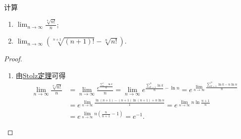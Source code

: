 \documentclass[lang=cn,newtx,10pt,scheme=chinese]{elegantbook}
\begin{document}
\begin{example}
计算
\begin{enumerate}
\item \(\lim_{n \to \infty} \frac{\sqrt[n]{n!}}{n}\);
\item \(\lim_{n \to \infty} (\sqrt[n + 1]{(n + 1)!} - \sqrt[n]{n!})\).
\end{enumerate}
\end{example}
\begin{proof}
\begin{enumerate}
\item 由\hyperref[theorem:Stolz定理]{Stolz定理}可得
\begin{align*}
\lim_{n\rightarrow \infty} \frac{\sqrt[n]{n!}}{n}&=\lim_{n\rightarrow \infty} \frac{e^{\frac{\sum\limits_{k=1}^n{\ln k}}{n}}}{n}=\lim_{n\rightarrow \infty} e^{\frac{\sum\limits_{k=1}^n{\ln k}}{n}-\ln n}=e^{\lim\limits_{n\rightarrow \infty} \frac{\sum\limits_{k=1}^n{\ln k}-n\ln n}{n}}
\\
&=e^{\lim\limits_{n\rightarrow \infty} \frac{\ln \left(n+1\right)-\left( n+1 \right) \ln \left( n+1 \right) +n\ln n}{1}}=e^{\lim\limits_{n\rightarrow \infty} n \ln \frac{n+1}{n}}
\\
&=e^{\lim\limits_{n\rightarrow \infty} n\left( \frac{n}{n+1}-1 \right)}=e^{-1}.
\end{align*}


\end{enumerate}
\end{proof}
\end{document}
